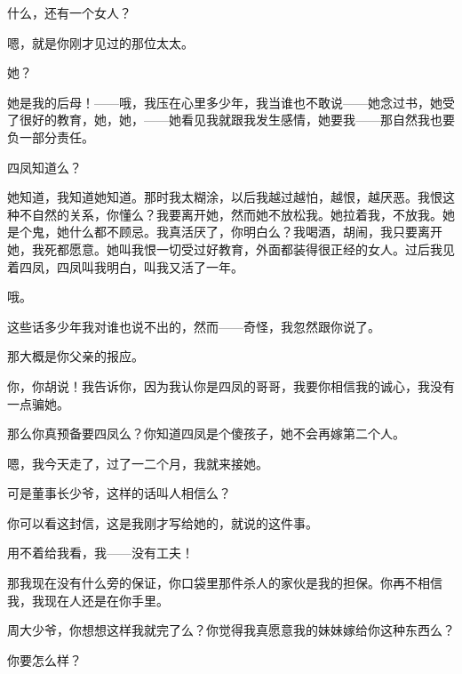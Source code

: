 什么，还有一个女人？

嗯，就是你刚才见过的那位太太。

她？

她是我的后母！——哦，我压在心里多少年，我当谁也不敢说——她念过书，她受了很好的教育，她，她，——她看见我就跟我发生感情，她要我——那自然我也要负一部分责任。

四凤知道么？

她知道，我知道她知道。那时我太糊涂，以后我越过越怕，越恨，越厌恶。我恨这种不自然的关系，你懂么？我要离开她，然而她不放松我。她拉着我，不放我。她是个鬼，她什么都不顾忌。我真活厌了，你明白么？我喝酒，胡闹，我只要离开她，我死都愿意。她叫我恨一切受过好教育，外面都装得很正经的女人。过后我见着四凤，四凤叫我明白，叫我又活了一年。

哦。

这些话多少年我对谁也说不出的，然而——奇怪，我忽然跟你说了。

那大概是你父亲的报应。

你，你胡说！我告诉你，因为我认你是四凤的哥哥，我要你相信我的诚心，我没有一点骗她。

那么你真预备要四凤么？你知道四凤是个傻孩子，她不会再嫁第二个人。

嗯，我今天走了，过了一二个月，我就来接她。

可是董事长少爷，这样的话叫人相信么？

你可以看这封信，这是我刚才写给她的，就说的这件事。

用不着给我看，我——没有工夫！

那我现在没有什么旁的保证，你口袋里那件杀人的家伙是我的担保。你再不相信我，我现在人还是在你手里。

周大少爷，你想想这样我就完了么？你觉得我真愿意我的妹妹嫁给你这种东西么？

你要怎么样？

